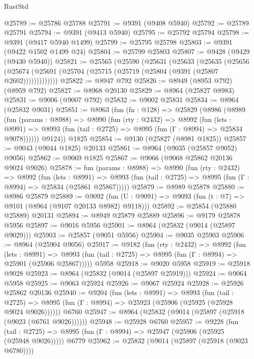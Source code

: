 \begin{lexlean}{RustStd}
\begin{coremodule}
@25789 := @25786 @25788
@25791 := @9391 (@9408 @5940)
@25792 := @25789 @25791
@25794 := @9391 (@9413 @5940)
@25795 := @25792 @25794
@25798 := @9391 (@9417 @5940 @1499)
@25799 := @25795 @25798
@25803 := @9391 (@9422 @1502 @1499 @24)
@25804 := @25799 @25803
@25807 := @9428 (@9429 (@9430 @5940))
@25821 := @25565
    (@25590
      (@25631
        (@25633
          (@25635
            (@25656
              (@25674 (@25691 (@25704 (@25715 (@25719 (@25804 (@9391 (@25807 @2602)))))))))))))
@25822 := @8947 @792
@25826 := @8949 (@8953 @792) (@8959 @792)
@25827 := @8968 @20130
@25829 := @8964 (@25827 @8983)
@25831 := @9006 (@9007 @792)
@25832 := @9002 @25831
@25834 := @8964 (@25832 @9031)
@25851 := @8963
    (fun (fn : @128) =>
    @25829
      (@8986
        (@8989
          (fun (params : @8988) =>
          @8990
            (fun (rty : @2432) =>
            @8992
              (fun (lets : @8991) =>
              @8993 (fun (tail : @2725) => @8995 (fun (Γ : @8994) => @25834 @9078))))))
        @9124))
    @1825
@25854 := @9130 (@25827 (@8981 @1825))
@25857 := @9043 (@9044 @1825) @20133
@25861 := @8964 (@9035 (@25857 @9052) @9056)
@25862 := @9069 @1825
@25867 := @9066 (@9068 @25862 @20136 @9024 @9026)
@25878 := fun (params : @8988) =>
  @8990
    (fun (rty : @2432) =>
    @8992
      (fun (lets : @8991) =>
      @8993 (fun (tail : @2725) => @8995 (fun (Γ : @8994) => @25834 (@25861 @25867)))))
@25879 := @8989 @25878
@25880 := @8986 @25879
@25889 := @9092
    (fun (U : @9091) => @9093 (fun (t : @7) => @9101 (@8964 (@9107 @20133 @8982) @9118)))
@25892 := @25854 (@25880 @25889) @20131
@25894 := @8949 @25879 @25889
@25896 := @9179 @25878 @5956
@25897 := @9016 @5956
@25901 := @8964 (@25832 (@9014 (@25897 @9029)))
@25903 := @25857 (@9051 @5956)
@25904 := @9035 @25903
@25906 := @8964 (@25904 @9056)
@25917 := @9182
    (fun (rty : @2432) =>
    @8992
      (fun (lets : @8991) =>
      @8993 (fun (tail : @2725) => @8995 (fun (Γ : @8994) => @25901 (@25906 @25867)))))
    @5958
@25918 := @9020 @5958
@25919 := @25918 @9028
@25923 := @8964 (@25832 (@9014 (@25897 @25919)))
@25924 := @9064 @5958
@25925 := @9063 @25924
@25926 := @9067 @25924
@25928 := @25926 @25862 @20136
@25940 := @9204
    (fun (lets : @8991) =>
    @8993
      (fun (tail : @2725) =>
      @8995 (fun (Γ : @8994) => @25923 (@25906 (@25925 (@25928 @9024 @9026))))))
    @6760
@25947 := @8964 (@25832 (@9014 (@25897 (@25918 (@9023 (@6761 @9026))))))
@25948 := @25928 @6760
@25957 := @9228
    (fun (tail : @2725) => @8995 (fun (Γ : @8994) => @25947 (@25906 (@25925 (@25948 @9026)))))
    @6779
@25962 := @25832 (@9014 (@25897 (@25918 (@9023 @6780))))

\end{coremodule}
\end{lexlean}
